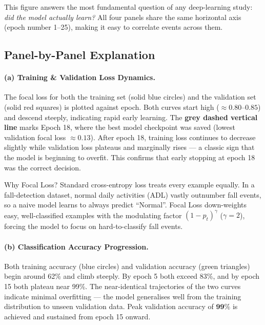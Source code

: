\documentclass[12pt,a4paper]{article}
\begin{document}
This figure answers the most fundamental question of any deep-learning study: \emph{did the model actually learn?} All four panels share the same horizontal axis (epoch number 1–25), making it easy to correlate events across them.

\subsection{Panel-by-Panel Explanation}

\paragraph{(a) Training \& Validation Loss Dynamics.}
The focal loss for both the training set (solid blue circles) and the validation set (solid red squares) is plotted against epoch. Both curves start high (${\approx}0.80$–$0.85$) and descend steeply, indicating rapid early learning. The \textbf{grey dashed vertical line} marks Epoch 18, where the best model checkpoint was saved (lowest validation focal loss ${\approx}0.13$). After epoch 18, training loss continues to decrease slightly while validation loss plateaus and marginally rises — a classic sign that the model is beginning to overfit. This confirms that early stopping at epoch 18 was the correct decision.

\begin{keybox}{Why Focal Loss?}
Standard cross-entropy loss treats every example equally. In a fall-detection dataset, normal daily activities (ADL) vastly outnumber fall events, so a naive model learns to always predict ``Normal''. Focal Loss down-weights easy, well-classified examples with the modulating factor $(1-p_t)^\gamma$ ($\gamma{=}2$), forcing the model to focus on hard-to-classify fall events.
\end{keybox}

\paragraph{(b) Classification Accuracy Progression.}
Both training accuracy (blue circles) and validation accuracy (green triangles) begin around 62\% and climb steeply. By epoch 5 both exceed 83\%, and by epoch 15 both plateau near 99\%. The near-identical trajectories of the two curves indicate minimal overfitting — the model generalises well from the training distribution to unseen validation data. Peak validation accuracy of $\mathbf{99\%}$ is achieved and sustained from epoch 15 onward.
\end{document}
